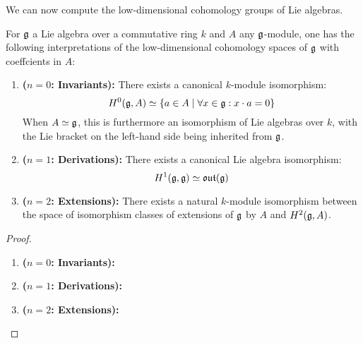                     We can now compute the low-dimensional cohomology groups of Lie algebras.
                    \begin{proposition} \label{prop: low_dimensional_cohomologies_of_lie_algebras}
                        For $\mathfrak{g}$ a Lie algebra over a commutative ring $k$ and $A$ any $\mathfrak{g}$-module, one has the following interpretations of the low-dimensional cohomology spaces of $\mathfrak{g}$ with coeffcients in $A$:
                        \begin{enumerate}
                            \item \textbf{($n = 0$: Invariants):} There exists a canonical $k$-module isomorphism:
                                $$H^0(\mathfrak{g}, A) \simeq \{a \in A \mid \forall x \in \mathfrak{g}: x \cdot a = 0\}$$
                            When $A \simeq \mathfrak{g}$, this is furthermore an isomorphism of Lie algebras over $k$, with the Lie bracket on the left-hand side being inherited from $\mathfrak{g}$.
                            \item \textbf{($n = 1$: Derivations):} There exists a canonical Lie algebra isomorphism:
                                $$H^1(\mathfrak{g}, \mathfrak{g}) \simeq \mathfrak{out}(\mathfrak{g})$$
                            \item \textbf{($n = 2$: Extensions):} There exists a natural $k$-module isomorphism between the space of isomorphism classes of extensions of $\mathfrak{g}$ by $A$ and $H^2(\mathfrak{g}, A)$.
                        \end{enumerate}
                    \end{proposition}
                        \begin{proof}
                            \noindent
                            \begin{enumerate}
                                \item \textbf{($n = 0$: Invariants):}
                                \item \textbf{($n = 1$: Derivations):}
                                \item \textbf{($n = 2$: Extensions):}
                            \end{enumerate}
                        \end{proof}
                    

